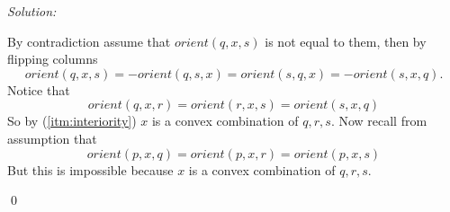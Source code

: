 \documentclass[a4paper, 8pt, oneside]{article}
\newenvironment{sol}
    {\emph{Solution:}
    }
    {
    \qed
    }
\begin{document}
\begin{enumerate}
\begin{enumerate}
\begin{sol}
By contradiction assume that $orient(q,x,s)$ is not equal to them, then by flipping columns
\begin{equation*}
orient(q,x,s) = -orient(q,s,x) = orient(s,q,x) = -orient(s,x,q).
\end{equation*}
Notice that
\begin{equation*}
 orient(q,x,r) = orient(r,x,s) = orient(s,x,q)
\end{equation*}
So by (\ref{itm:interiority}) $x$ is a convex combination of $q,r,s$.
Now recall from assumption that
\begin{equation*}
orient(p,x,q) = orient(p,x,r) = orient(p,x,s)
\end{equation*}
But this is impossible because $x$ is a convex combination of $q,r,s$.
\end{sol}
\end{enumerate}

\end{enumerate}
\end{document}
